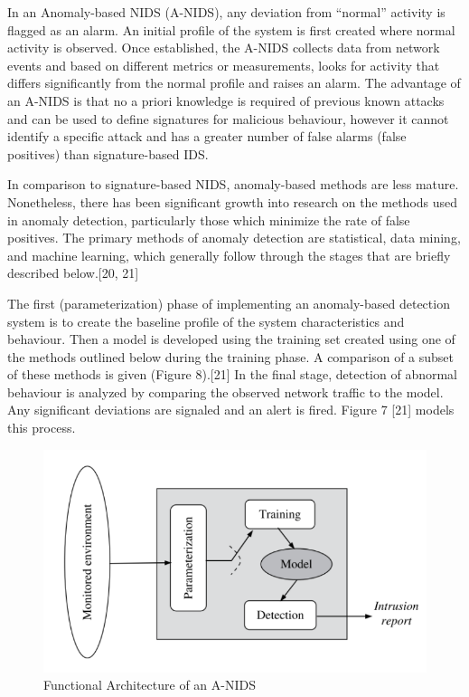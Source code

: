 \documentclass[11pt,]{article}
\begin{document}
In an Anomaly-based NIDS (A-NIDS), any deviation from ``normal''
activity is flagged as an alarm. An initial profile of the system is
first created where normal activity is observed. Once established, the
A-NIDS collects data from network events and based on different metrics
or measurements, looks for activity that differs significantly from the
normal profile and raises an alarm. The advantage of an A-NIDS is that
no a priori knowledge is required of previous known attacks and can be
used to define signatures for malicious behaviour, however it cannot
identify a specific attack and has a greater number of false alarms
(false positives) than signature-based IDS.

In comparison to signature-based NIDS, anomaly-based methods are less
mature. Nonetheless, there has been significant growth into research on
the methods used in anomaly detection, particularly those which minimize
the rate of false positives. The primary methods of anomaly detection
are statistical, data mining, and machine learning, which generally
follow through the stages that are briefly described below.{[}20, 21{]}

The first (parameterization) phase of implementing an anomaly-based
detection system is to create the baseline profile of the system
characteristics and behaviour. Then a model is developed using the
training set created using one of the methods outlined below during the
training phase. A comparison of a subset of these methods is given
(Figure 8).{[}21{]} In the final stage, detection of abnormal behaviour
is analyzed by comparing the observed network traffic to the model. Any
significant deviations are signaled and an alert is fired. Figure 7
{[}21{]} models this process.

\begin{figure}[h]

{\centering \includegraphics{thesis_files/figure-latex/unnamed-chunk-10-1} 

}

\caption{Functional Architecture of an A-NIDS}\label{fig:unnamed-chunk-10}
\end{figure}
\end{document}
